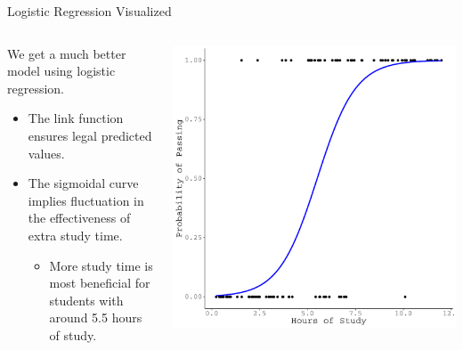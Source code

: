 \documentclass{beamer}\usepackage[]{graphicx}\usepackage[]{color}
\makeatletter
\def\maxwidth{ %
  \ifdim\Gin@nat@width>\linewidth
    \linewidth
  \else
    \Gin@nat@width
  \fi
}
\newenvironment{knitrout}{}{} %
\makeatother
\begin{document}

\begin{frame}{Logistic Regression Visualized}

  \begin{columns}
    \begin{column}{0.5\textwidth}
      
      We get a much better model using logistic regression.
      \vc
      \begin{itemize}
      \item The link function ensures legal predicted values.
        \vc
      \item The sigmoidal curve implies fluctuation in the effectiveness of
        extra study time.  
        \vc
        \begin{itemize}
        \item More study time is most beneficial for students with around 
          5.5 hours of study. 
        \end{itemize}
      \end{itemize}
      
    \end{column}
    
    \begin{column}{0.5\textwidth}
      
\begin{knitrout}\footnotesize
{}\color{fgcolor}

{\centering \includegraphics[width=\maxwidth]{figure/unnamed-chunk-3-1} 

}



\end{knitrout}

\end{column}
\end{columns}
  
\end{frame}
\end{document}
